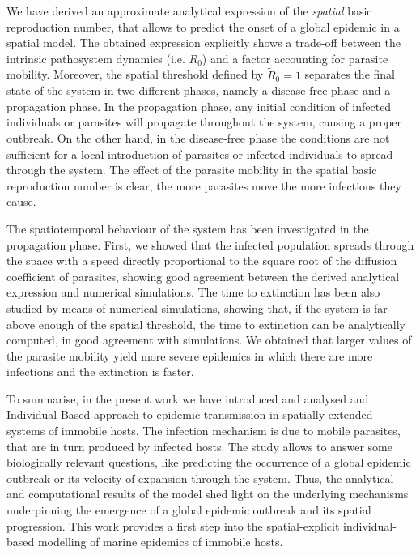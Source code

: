 We have derived an approximate analytical expression of the
\textit{spatial} basic reproduction number, that allows to predict the onset of
a global epidemic in a spatial model. The obtained expression explicitly shows
a trade-off between the intrinsic pathosystem dynamics (i.e. $R_0$) and a
factor accounting for parasite mobility. Moreover, the spatial threshold
defined by $\tilde{R}_0=1$ separates the final state of the system in two
different phases, namely a disease-free phase and a propagation phase. In the
propagation phase, any initial condition of infected individuals or parasites
will propagate throughout the system, causing a proper outbreak. On the other
hand, in the disease-free phase the conditions are not sufficient for a local
introduction of parasites or infected individuals to spread through the system.
The effect of the parasite mobility in the spatial basic reproduction number is
clear, the more parasites move the more infections they cause.

The spatiotemporal behaviour of the system has been investigated in the
propagation phase. First, we showed that the infected population spreads
through the space with a speed directly proportional to the square root of the
diffusion coefficient of parasites, showing good agreement between the derived
analytical expression and numerical simulations. The time to extinction has
been also studied by means of numerical simulations, showing that, if the
system is far above enough of the spatial threshold, the time to extinction can
be analytically computed, in good agreement with simulations. We obtained that
larger values of the parasite mobility yield more severe epidemics in which
there are more infections and the extinction is faster.

To summarise, in the present work we have introduced and analysed and
Individual-Based approach to epidemic transmission in spatially extended
systems of immobile hosts. The infection mechanism is due to mobile parasites,
that are in turn produced by infected hosts. The study allows to answer some
biologically relevant questions, like predicting the occurrence of a global
epidemic outbreak or its velocity of expansion through the system. Thus, the
analytical and computational results of the model shed light on the underlying
mechanisms underpinning the emergence of a global epidemic outbreak and its
spatial progression. This work provides a first step into the spatial-explicit
individual-based modelling of marine epidemics of immobile hosts.

